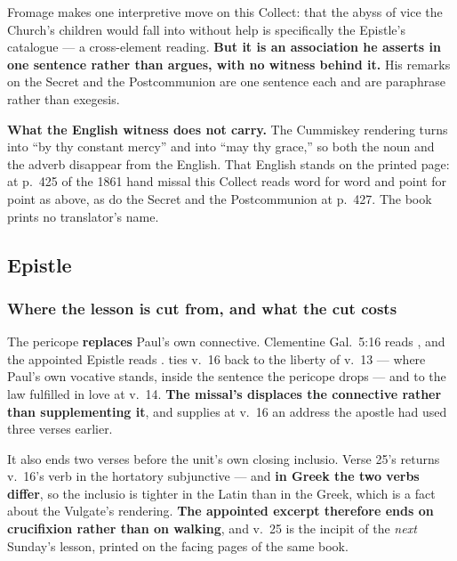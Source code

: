 Fromage makes one interpretive move on this Collect: that the abyss of vice
the Church's children would fall into without help is specifically the Epistle's
catalogue --- a cross-element reading. \textbf{But it is an association he
asserts in one sentence rather than argues, with no witness behind it.} His
remarks on the Secret and the Postcommunion are one sentence each and are
paraphrase rather than exegesis.

\textbf{What the English witness does not carry.} The Cummiskey rendering turns
 into ``by thy constant mercy'' and  into ``may thy grace,'' so both the noun  and
the adverb  disappear from the English. That English stands on
the printed page: at p.~425 of the 1861 hand missal this Collect reads word for
word and point for point as above, as do the Secret and the Postcommunion at
p.~427. The book prints no translator's name.

\elementguard
\subsection*{Epistle }


\subsubsection*{Where the lesson is cut from, and what the cut costs}

The pericope \textbf{replaces} Paul's own connective. Clementine Gal.\ 5:16
reads , and the appointed Epistle reads
.  ties v.~16 back to the
liberty of v.~13 --- where Paul's own vocative  stands, inside
the sentence the pericope drops --- and to the law fulfilled in love at v.~14.
\textbf{The missal's  displaces the connective rather than
supplementing it}, and supplies at v.~16 an address the apostle had used three
verses earlier.

It also ends two verses before the unit's own closing inclusio. Verse 25's
 returns v.~16's verb in the
hortatory subjunctive --- and \textbf{in Greek the two verbs differ}, so the
inclusio is tighter in the Latin than in the Greek, which is a fact about the
Vulgate's rendering. \textbf{The appointed excerpt therefore ends on crucifixion
rather than on walking}, and v.~25 is the incipit of the \emph{next} Sunday's
lesson, printed on the facing pages of the same book.

